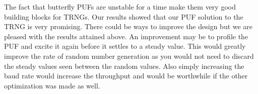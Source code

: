 		The fact that butterfly PUFs are unstable for a time make them very good building blocks for TRNGs.  Our results showed that our PUF solution to the TRNG is very promising.  There could be ways to improve the design but we are pleased with the results attained above.  An improvement may be to profile the PUF and excite it again before it settles to a steady value.  This would greatly improve the rate of random number generation as you would not need to discard the steady values seen between the random values.  Also simply increasing the baud rate would increase the throughput and would be worthwhile if the other optimization was made as well.














